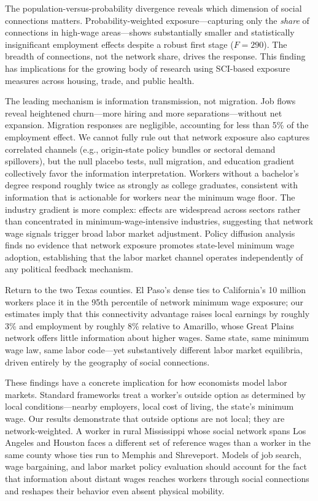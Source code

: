 \documentclass[12pt]{article}
\begin{document}
The population-versus-probability divergence reveals which dimension of social connections matters. Probability-weighted exposure---capturing only the \textit{share} of connections in high-wage areas---shows substantially smaller and statistically insignificant employment effects despite a robust first stage ($F = 290$). The breadth of connections, not the network share, drives the response. This finding has implications for the growing body of research using SCI-based exposure measures across housing, trade, and public health.

The leading mechanism is information transmission, not migration. Job flows reveal heightened churn---more hiring and more separations---without net expansion. Migration responses are negligible, accounting for less than 5\% of the employment effect. We cannot fully rule out that network exposure also captures correlated channels (e.g., origin-state policy bundles or sectoral demand spillovers), but the null placebo tests, null migration, and education gradient collectively favor the information interpretation. Workers without a bachelor's degree respond roughly twice as strongly as college graduates, consistent with information that is actionable for workers near the minimum wage floor. The industry gradient is more complex: effects are widespread across sectors rather than concentrated in minimum-wage-intensive industries, suggesting that network wage signals trigger broad labor market adjustment. Policy diffusion analysis finds no evidence that network exposure promotes state-level minimum wage adoption, establishing that the labor market channel operates independently of any political feedback mechanism.

Return to the two Texas counties. El Paso's dense ties to California's 10 million workers place it in the 95th percentile of network minimum wage exposure; our estimates imply that this connectivity advantage raises local earnings by roughly 3\% and employment by roughly 8\% relative to Amarillo, whose Great Plains network offers little information about higher wages. Same state, same minimum wage law, same labor code---yet substantively different labor market equilibria, driven entirely by the geography of social connections.

These findings have a concrete implication for how economists model labor markets. Standard frameworks treat a worker's outside option as determined by local conditions---nearby employers, local cost of living, the state's minimum wage. Our results demonstrate that outside options are not local; they are network-weighted. A worker in rural Mississippi whose social network spans Los Angeles and Houston faces a different set of reference wages than a worker in the same county whose ties run to Memphis and Shreveport. Models of job search, wage bargaining, and labor market policy evaluation should account for the fact that information about distant wages reaches workers through social connections and reshapes their behavior even absent physical mobility.
\end{document}
